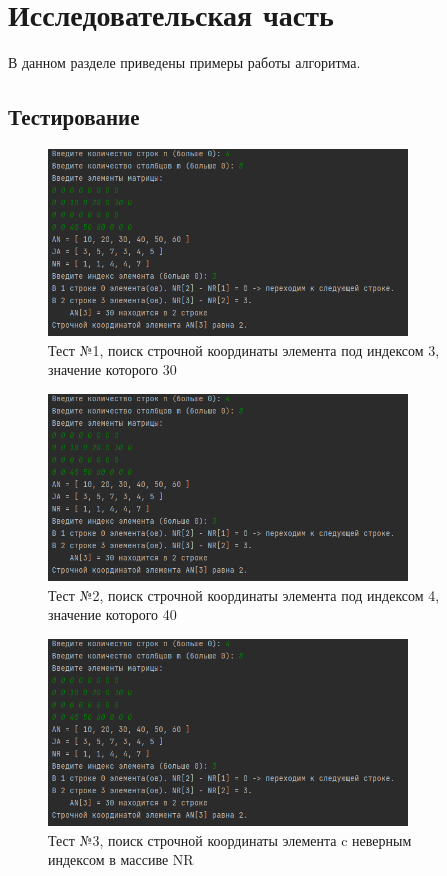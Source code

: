 \chapter{Исследовательская часть}

В данном разделе приведены примеры работы алгоритма.

\section{Тестирование}

\begin{figure}[h]
	\centering
	\includegraphics[width=0.85\textwidth]{img/test-01.png}
	\caption{Тест №1, поиск строчной координаты элемента под индексом 3, значение которого 30}
	\label{fig:test-01}
\end{figure}

\begin{figure}[h]
	\centering
	\includegraphics[width=0.85\textwidth]{img/test-01.png}
	\caption{Тест №2, поиск строчной координаты элемента под индексом 4, значение которого 40}
	\label{fig:test-02}
\end{figure}

\begin{figure}[h]
	\centering
	\includegraphics[width=0.85\textwidth]{img/test-01.png}
	\caption{Тест №3, поиск строчной координаты элемента c неверным индексом в массиве NR}
	\label{fig:test-03}
\end{figure}